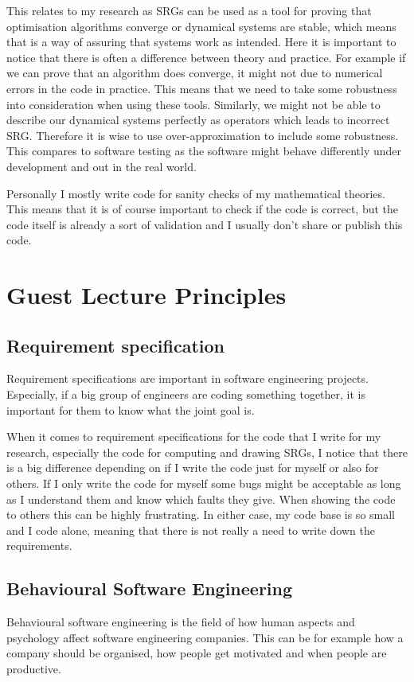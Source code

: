\documentclass[a4paper, 11pt]{article}
\begin{document}
This relates to my research as SRGs can be used as a tool for proving that optimisation algorithms converge or dynamical systems are stable, which means that is a way of assuring that systems work as intended. Here it is important to notice that there is often a difference between theory and practice. For example if we can prove that an algorithm does converge, it might not due to numerical errors in the code in practice. This means that we need to take some robustness into consideration when using these tools. Similarly, we might not be able to describe our dynamical systems perfectly as operators which leads to incorrect SRG. Therefore it is wise to use over-approximation to include some robustness. This compares to software testing as the software might behave differently under development and out in the real world. 

Personally I mostly write code for sanity checks of my mathematical theories. This means that it is of course important to check if the code is correct, but the code itself is already a sort of validation and I usually don't share or publish this code.


\section{Guest Lecture Principles}

\subsection{Requirement specification}
Requirement specifications are important in software engineering projects. Especially, if a big group of engineers are coding something together, it is important for them to know what the joint goal is. 

When it comes to requirement specifications for the code that I write for my research, especially the code for computing and drawing SRGs, I notice that there is a big difference depending on if I write the code just for myself or also for others. If I only write the code for myself some bugs might be acceptable as long as I understand them and know which faults they give. When showing the code to others this can be highly frustrating. In either case, my code base is so small and I code alone, meaning that there is not really a need to write down the requirements. 

\subsection{Behavioural Software Engineering}
Behavioural software engineering is the field of how human aspects and psychology affect software engineering companies. This can be for example how a company should be organised, how people get motivated and when people are productive. 
\end{document}
